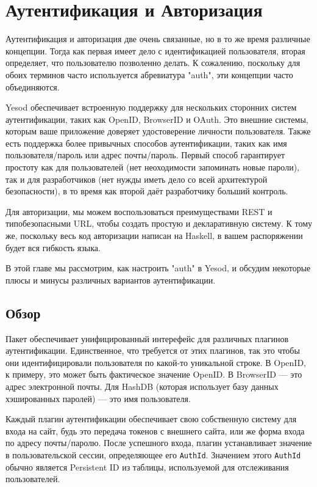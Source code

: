 \chapter{Аутентификация и Авторизация}\label{chap:auth}

Аутентификация и авторизация две очень связанные, но в то же время различные концепции. Тогда как первая имеет дело с идентификацией пользователя, вторая определяет, что пользователю позволенно делать. К сожалению, поскольку для обоих терминов часто используется абревиатура "auth", эти концепции часто объединяются.

Yesod обеспечивает встроенную поддержку для нескольких сторонних систем аутентификации, таких как OpenID, BrowserID и OAuth. Это внешние системы, которым ваше приложение доверяет удостоверение личности пользователя. Также есть поддержка более привычных способов аутентификации, таких как имя пользователя/пароль или адрес почты/пароль. Первый способ гарантирует простоту как для пользователей (нет неоходимости запоминать новые пароли), так и для разработчиков (нет нужды иметь дело со всей архитектурой безопасности), в то время как второй даёт разработчику больший контроль.

Для авторизации, мы можем воспользоваться преимуществами REST и типобезопасными URL, чтобы создать простую и декларативную систему. К тому же, поскольку весь код авторизации написан на Haskell, в вашем распоряжении будет вся гибкость языка.

В этой главе мы рассмотрим, как настроить "auth" в Yesod, и обсудим некоторые плюсы и минусы различных вариантов аутентификации.

\section{Обзор}


Пакет  обеспечивает унифицированный интерефейс для различных плагинов аутентификации. Единственное, что требуется от этих плагинов, так это чтобы они идентифицировали пользователя по какой-то уникальной строке. В OpenID, к примеру, это может быть фактическое значение OpenID. В BrowserID --- это адрес электронной почты. Для HashDB (которая использует базу данных хэшированных паролей) --- это имя пользователя.

Каждый плагин аутентификации обеспечивает свою собственную систему для входа на сайт, будь это передача токенов с внешнего сайта, или же форма входа по адресу почты/паролю. После успешного входа, плагин устанавливает значение в пользовательской сессии, определяющее его \lstinline'AuthId'. Значением этого \lstinline'AuthId' обычно является Persistent ID из таблицы, используемой для отслеживания пользователей. 

